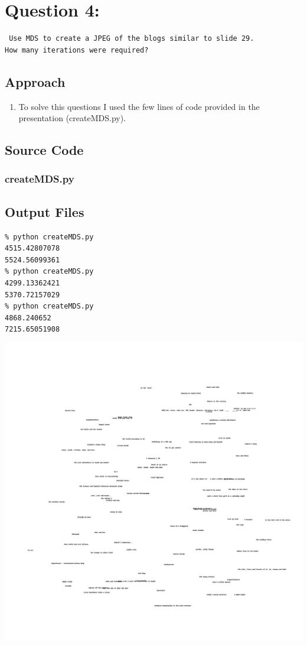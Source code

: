 \documentclass[12pt]{article}
\begin{document}
\section{Question 4:}
\begin{verbatim}
 Use MDS to create a JPEG of the blogs similar to slide 29.  
How many iterations were required?
\end{verbatim}
\subsection{Approach}
\begin{enumerate}
    \item To solve this questions I used the few lines of code provided in the presentation (createMDS.py).
\end{enumerate}

\subsection{Source Code}
\subsubsection{createMDS.py}


\subsection{Output Files}
\begin{verbatim}
% python createMDS.py
4515.42807078
5524.56099361
% python createMDS.py
4299.13362421
5370.72157029
% python createMDS.py
4868.240652
7215.65051908
\end{verbatim}
\newpage

\includegraphics[scale=0.2]{../Q4/blogs2d}




\newpage



\cite{*}
\newpage
\end{document}
